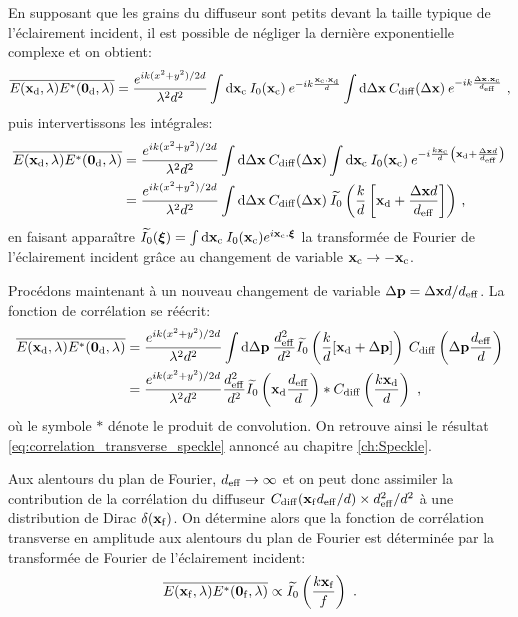 En supposant que les grains du diffuseur sont petits devant la taille typique de l'éclairement incident, il est possible de négliger la dernière exponentielle complexe et on obtient:
\begin{equation}
\overline{E(\mathbf{x}_{\mathrm{d}},\lambda)E^*(\mathbf{0}_{\mathrm{d}},\lambda)} = \frac{e^{i k (x^2+y^2)/2d}}{\lambda^2 d^2} \int{\mathop{}\mathopen{}\mathrm{d}\mathbf{x}_{\mathrm{c}}\: I_0(\mathbf{x}_{\mathrm{c}}) \: e^{-i k \frac{\mathbf{x}_{\mathrm{c}}.\mathbf{x}_{\mathrm{d}}}{d}}}  \int{\mathop{}\mathopen{}\mathrm{d}\Delta\mathbf{x}\: C_{\mathrm{diff}}(\Delta\mathbf{x}) \: e^{-ik \frac{\Delta\mathbf{x}. \mathbf{x}_{\mathrm{c}}}{d_{\mathrm{eff}}}} } \text{ ,}
\end{equation}
puis intervertissons les intégrales:
\begin{align}
\overline{E(\mathbf{x}_{\mathrm{d}},\lambda)E^*(\mathbf{0}_{\mathrm{d}},\lambda)}&=\frac{e^{ik (x^2+y^2)/2d}}{\lambda^2 d^2} \int{\mathop{}\mathopen{}\mathrm{d}\Delta\mathbf{x}\: C_{\mathrm{diff}}(\Delta\mathbf{x}) \int{\mathop{}\mathopen{}\mathrm{d}\mathbf{x}_{\mathrm{c}}\: I_0(\mathbf{x}_{\mathrm{c}}) \: e^{-i\frac{k\mathbf{x}_{\mathrm{c}}}{d} \left(\mathbf{x}_{\mathrm{d}}+\frac{\Delta\mathbf{x}d}{d_{\mathrm{eff}}}\right)}}} \\
&= \frac{e^{ik(x^2+y^2)/2d}}{\lambda^2 d^2} \int{\mathop{}\mathopen{}\mathrm{d}\Delta\mathbf{x}\: C_{\mathrm{diff}}(\Delta\mathbf{x}) \: \widetilde{I_0}\left( \frac{k}{d}\left[ \mathbf{x}_{\mathrm{d}}+ \frac{\Delta\mathbf{x}d}{d_{\mathrm{eff}}} \right]\right)} \text{ ,}
\end{align}
en faisant apparaître $\widetilde{I_0}(\boldsymbol{\xi})=\int{\mathop{}\mathopen{}\mathrm{d}\mathbf{x}_{\mathrm{c}}\: I_0(\mathbf{x}_{\mathrm{c}}) e^{i\mathbf{x}_{\mathrm{c}}.\boldsymbol{\xi}}}$ la transformée de Fourier de l'éclairement incident grâce au changement de variable $\mathbf{x}_{\mathrm{c}}\rightarrow - \mathbf{x}_{\mathrm{c}}$.

Procédons maintenant à un nouveau changement de variable $\Delta\mathbf{p}=\Delta\mathbf{x} d/d_{\mathrm{eff}}$. La fonction de corrélation se réécrit:
\begin{align}
\overline{E(\mathbf{x}_{\mathrm{d}},\lambda) E^*(\mathbf{0}_{\mathrm{d}},\lambda)}&= \frac{e^{ik (x^2+y^2)/2d}}{\lambda^2 d^2} \int{\mathop{}\mathopen{}\mathrm{d}\Delta\mathbf{p} \:\frac{d_{\mathrm{eff}}^2}{d^2} \widetilde{I_0}\left( \frac{k}{d}[\mathbf{x}_{\mathrm{d}}+\Delta\mathbf{p}]\right) \: C_{\mathrm{diff}}\left( \Delta\mathbf{p}\frac{d_{\mathrm{eff}}}{d}\right)}\\
&=\frac{e^{ik (x^2+y^2)/2d}}{\lambda^2 d^2} \frac{d_{\mathrm{eff}}^2}{d^2} \widetilde{I_0}\left(\mathbf{x}_{\mathrm{d}}\frac{d_{\mathrm{eff}}}{d} \right) \ast C_{\mathrm{diff}}\left(\frac{k\mathbf{x}_{\mathrm{d}}}{d}\right) \text{ ,}
\end{align}
où le symbole $\ast$ dénote le produit de convolution. On retrouve ainsi le résultat \ref{eq:correlation_transverse_speckle} annoncé au chapitre \ref{ch:Speckle}. 

Aux alentours du plan de Fourier, $d_{\mathrm{eff}}\rightarrow\infty$ et on peut donc assimiler la contribution de la corrélation du diffuseur $C_{\mathrm{diff}}(\mathbf{x}_{\mathrm{f}}d_{\mathrm{eff}}/d) \times d_{\mathrm{eff}}^2/d^2$ à une distribution de Dirac $\delta(\mathbf{x}_{\mathrm{f}})$. On détermine alors que la fonction de corrélation transverse en amplitude aux alentours du plan de Fourier est déterminée par la transformée de Fourier de l'éclairement incident:
\begin{equation}
\overline{E(\mathbf{x}_{\mathrm{f}},\lambda)E^*(\mathbf{0}_{\mathrm{f}},\lambda)} \propto \widetilde{I_0}\left(\frac{k\mathbf{x}_{\mathrm{f}}}{f} \right) \text{ .}
\end{equation}



